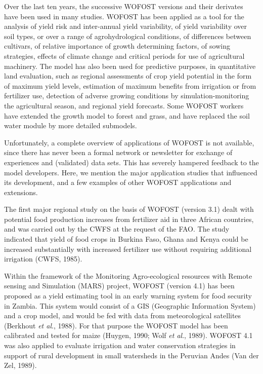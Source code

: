 Over the last ten years, the successive WOFOST versions and their derivates have been
used in many studies. WOFOST has been applied as a tool for the analysis of yield risk
and inter-annual yield variability, of yield variability over soil types, or over a range of
agrohydrological conditions, of differences between cultivars, of relative importance of
growth determining factors, of sowing strategies, effects of climate change and critical
periods for use of agricultural machinery. The model has also been used for predictive
pur\-poses, in quantitative land evaluation, such as regional assessments of crop yield
potential in the form of maximum yield levels, estimation of maximum benefits from
irrigation or from fertilizer use, detection of adverse growing condi\-tions by 
simulation-monitoring the agricultural season, and regional yield forecasts. Some WOFOST 
workers have extended the growth model to forest and grass, and have replaced the soil water
module by more detailed submodels.

Unfortunately, a complete overview of applications of WOFOST is not available, since
there has never been a formal network or newsletter for exchange of experiences and
(validat\-ed) data sets. This has severely hampered feedback to the model devel\-opers. Here,
we mention the major application studies that influenced its development, and a few
examples of other WOFOST applications and extensions.

The first major regional study on the basis of WOFOST (version 3.1) dealt with potential
food production increases from fertilizer aid in three African countries, and was carried
out by the CWFS at the request of the FAO. The study indicated that yield of food crops
in Burkina Faso, Ghana and Kenya could be increased substantially with increased
fertilizer use without requiring additional irrigation (CWFS, 1985).

Within the framework of the Monitoring Agro-ecological resources with Remote sensing
and Simulation (MARS) project, WOFOST (version 4.1) has been proposed as a yield
estimating tool in an early warning system for food security in Zambia. This system
would consist of a GIS (Geographic Information System) and a crop model, and would be
fed with data from meteorological satellites (Berkhout {\it et al}., 1988). For that purpose the
WOFOST model has been calibrated and tested for maize (Huygen, 1990; Wolf {\it et al}.,
1989). WOFOST 4.1 was also applied to evaluate irrigation and water conservation 
strat\-egies in support of rural development in small watersheds in the Peruvian Andes 
(Van der Zel, 1989).

